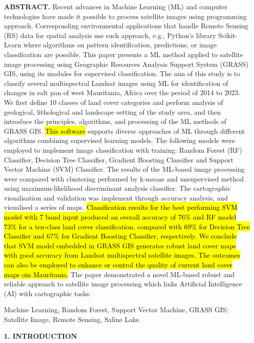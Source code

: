 \documentclass[12pt,a4paper,oneside]{article}
\def \newsection{\vspace{12pt}\textbf}
\def \newpar{\vspace{6pt}}
\begin{document}
{\bf ABSTRACT.} Recent advances in Machine Learning (ML) and computer technologies have made it possible to process satellite images using programming approach. Corresponding environmental applications that handle Remote Sensing (RS) data for spatial analysis use such approach, e.g., Python's library Scikit-Learn where algorithms on pattern identification, predictions, or image classification are possible. This paper presents a ML method applied to satellite image processing using Geographic Resources Analysis Support System (GRASS) GIS, using its modules for supervised classification. The aim of this study is to classify several multispectral Landsat images using ML for identification of changes in salt pan of west Mauritania, Africa over the period of 2014 to 2023. We first define 10 classes of land cover categories and perform analysis of geological, lithological and landscape setting of the study area, and then introduce the principles, algorithms, and processing of the ML methods of GRASS GIS. \hl{This software} supports diverse approaches of ML through different algorithms combining supervised learning models. The following models were employed to implement image classification with training: Random Forest (RF) Classifier, Decision Tree Classifier, Gradient Boosting Classifier and Support Vector Machine (SVM) Classifier. The results of the ML-based image processing were compared with clustering performed by k-means and unsupervised method using maximum-likelihood discriminant analysis classifier. The cartographic visualisation and validation was implement through accuracy analysis, and visualised a series of maps. \hl{Classification results for the best performing SVM model with 7 band input produced an overall accuracy of 76\% and RF model 73\% for a ten-class land cover classification, compared with 69\% for Decision Tree Classifier and 67\% for Gradient Boosting Classifier, respectively. We conclude that SVM model embedded in GRASS GIS generates robust land cover maps with good accuracy from Landsat multispectral satellite images. The outcomes can also be employed to enhance or control the quality of current land cover maps oin Mauritania.} The paper demonstrated a novel ML-based robust and reliable approach to satellite image processing which links Artificial Intelligence (AI) with cartographic tasks.

\newpar {\bf Keywords:} Machine Learning, Random Forest, Support Vector Machine, GRASS GIS; Satellite Image, Remote Sensing, Saline Lake.

\pagebreak
\newsection {1. INTRODUCTION}
\end{document}
